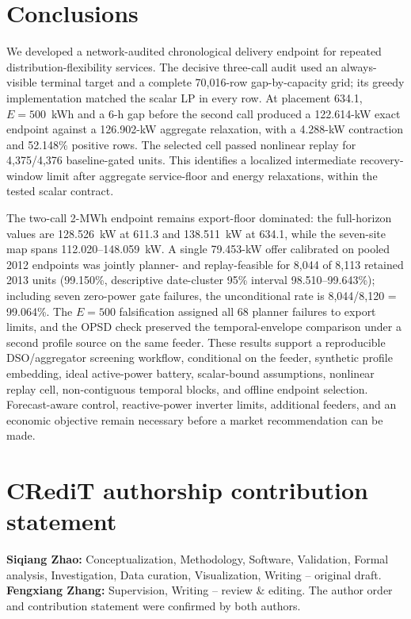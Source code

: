 \documentclass[11pt]{article}
\begin{document}
\section{Conclusions}
We developed a network-audited chronological delivery endpoint for repeated distribution-flexibility services. The decisive three-call audit used an always-visible terminal target and a complete 70,016-row gap-by-capacity grid; its greedy implementation matched the scalar LP in every row. At placement 634.1, \(E=500\)~kWh and a 6-h gap before the second call produced a 122.614-kW exact endpoint against a 126.902-kW aggregate relaxation, with a 4.288-kW contraction and 52.148\% positive rows. The selected cell passed nonlinear replay for 4,375/4,376 baseline-gated units. This identifies a localized intermediate recovery-window limit after aggregate service-floor and energy relaxations, within the tested scalar contract.

The two-call 2-MWh endpoint remains export-floor dominated: the full-horizon values are 128.526~kW at 611.3 and 138.511~kW at 634.1, while the seven-site map spans 112.020--148.059~kW. A single 79.453-kW offer calibrated on pooled 2012 endpoints was jointly planner- and replay-feasible for 8,044 of 8,113 retained 2013 units (99.150\%, descriptive date-cluster 95\% interval 98.510--99.643\%); including seven zero-power gate failures, the unconditional rate is 8,044/8,120 = 99.064\%. The \(E=500\) falsification assigned all 68 planner failures to export limits, and the OPSD check preserved the temporal-envelope comparison under a second profile source on the same feeder. These results support a reproducible DSO/aggregator screening workflow, conditional on the feeder, synthetic profile embedding, ideal active-power battery, scalar-bound assumptions, nonlinear replay cell, non-contiguous temporal blocks, and offline endpoint selection. Forecast-aware control, reactive-power inverter limits, additional feeders, and an economic objective remain necessary before a market recommendation can be made.

\clearpage
\section*{CRediT authorship contribution statement}
\textbf{Siqiang Zhao:} Conceptualization, Methodology, Software, Validation, Formal analysis, Investigation, Data curation, Visualization, Writing -- original draft. \textbf{Fengxiang Zhang:} Supervision, Writing -- review \& editing. The author order and contribution statement were confirmed by both authors.
\end{document}
